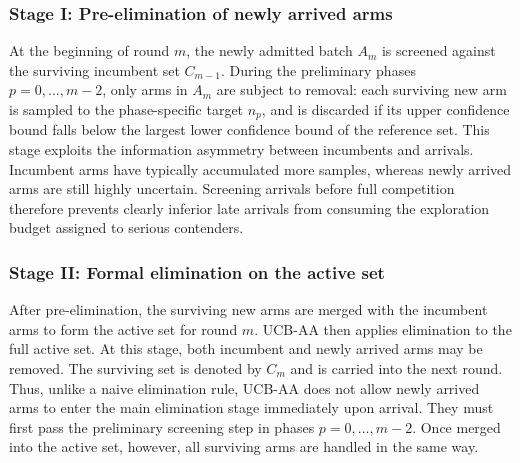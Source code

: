 \documentclass[
  12pt]{article}
\begin{document}

\subsubsection{Stage I: Pre-elimination of newly arrived arms}

At the beginning of round \(m\), the newly admitted batch \(A_m\) is screened
against the surviving incumbent set \(C_{m-1}\). During the preliminary phases
\(p=0,\ldots,m-2\), only arms in \(A_m\) are subject to removal: each surviving
new arm is sampled to the phase-specific target \(n_p\), and is discarded if its
upper confidence bound falls below the largest lower confidence bound of the
reference set.
This stage exploits the information asymmetry between incumbents and arrivals.
Incumbent arms have typically accumulated more samples, whereas newly arrived
arms are still highly uncertain. Screening arrivals before full competition
therefore prevents clearly inferior late arrivals from consuming the exploration
budget assigned to serious contenders.

\subsubsection{Stage II: Formal elimination on the active set}

After pre-elimination, the surviving new arms are merged with the incumbent arms to form
the active set for round \(m\). UCB-AA then applies elimination to the full active set.
At this stage, both incumbent and newly arrived arms may be removed. The surviving set is
denoted by \(C_m\) and is carried into the next round. Thus, unlike a naive elimination rule, UCB-AA does not allow newly arrived arms to enter the main elimination stage immediately upon arrival. They must first pass the preliminary screening step in phases $p=0,\ldots,m-2$. Once merged into the active set, however, all surviving arms are handled in the same way.
\end{document}
